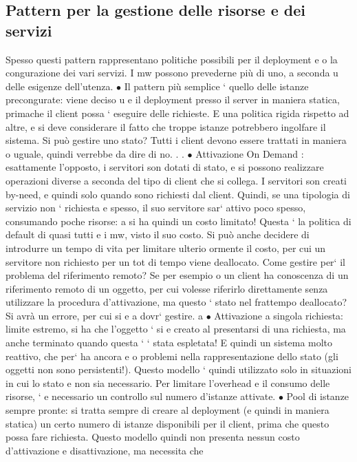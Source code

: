 \documentclass[a4paper,12pt]{article}
\begin{document}
\subsection{Pattern per la gestione delle risorse e dei servizi}
Spesso questi pattern rappresentano politiche possibili per il deployment e o la
congurazione dei vari servizi. I mw possono prevederne più di uno, a seconda
u
delle esigenze dell'utenza.
$\bullet$ Il pattern più semplice ` quello delle istanze precongurate: viene deciso
u
e
il deployment presso il server in maniera statica, primache il client possa
`
eseguire delle richieste. E una politica rigida rispetto ad altre, e si deve
considerare il fatto che troppe istanze potrebbero ingolfare il sistema. Si
può gestire uno stato? Tutti i client devono essere trattati in maniera
o
uguale, quindi verrebbe da dire di no. . .
$\bullet$ Attivazione On Demand : esattamente l'opposto, i servitori son dotati di
stato, e si possono realizzare operazioni diverse a seconda del tipo di client
che si collega. I servitori son creati by-need, e quindi solo quando sono
richiesti dal client. Quindi, se una tipologia di servizio non ` richiesta
e
spesso, il suo servitore sar` attivo poco spesso, consumando poche risorse:
a
si ha quindi un costo limitato! Questa ` la politica di default di quasi tutti
e
i mw, visto il suo costo.
Si può anche decidere di introdurre un tempo di vita per limitare ulterio
ormente il costo, per cui un servitore non richiesto per un tot di tempo
viene deallocato.
Come gestire per` il problema del riferimento remoto? Se per esempio
o
un client ha conoscenza di un riferimento remoto di un oggetto, per cui
volesse riferirlo direttamente senza utilizzare la procedura d'attivazione,
ma questo ` stato nel frattempo deallocato? Si avrà un errore, per cui si
e
a
dovr` gestire.
a
$\bullet$ Attivazione a singola richiesta: limite estremo, si ha che l'oggetto ` si
e
creato al presentarsi di una richiesta, ma anche terminato quando questa
`
` stata espletata! E quindi un sistema molto reattivo, che per` ha ancora
e
o
problemi nella rappresentazione dello stato (gli oggetti non sono persistenti!). Questo modello ` quindi utilizzato solo
in situazioni in cui lo stato
e
non sia necessario. Per limitare l'overhead e il consumo delle risorse, `
e
necessario un controllo sul numero d'istanze attivate.
$\bullet$ Pool di istanze sempre pronte: si tratta sempre di creare al deployment
(e quindi in maniera statica) un certo numero di istanze disponibili per
il client, prima che questo possa fare richiesta. Questo modello quindi
non presenta nessun costo d'attivazione e disattivazione, ma necessita che
\end{document}
